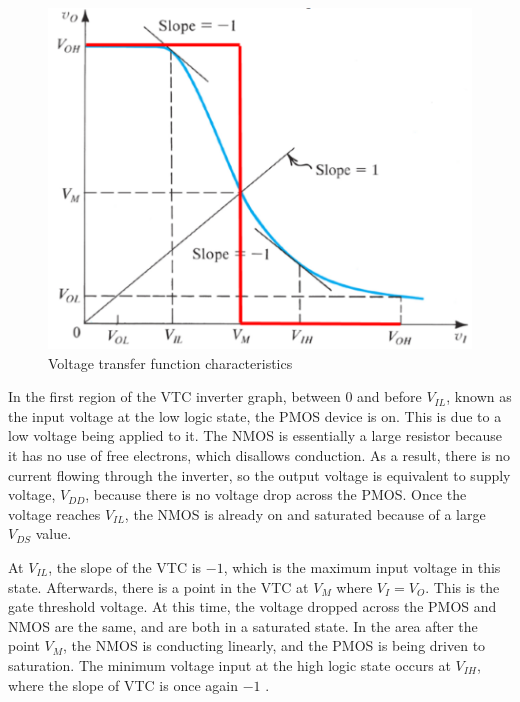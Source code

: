 \begin{figure}[H]
    \centering
        \centering
        \includegraphics[scale = .25]{CircuitDevelopment/cd4007SIM/VTCInverter.png}
        \caption{Voltage transfer function characteristics}
        \label{fig:VTCchar}
\end{figure} 

In the first region of the VTC inverter graph, between 0 and before $V_{IL}$, known as the input voltage at the low logic state, the PMOS device is on. This is due to a low voltage being applied to it. The NMOS is essentially a large resistor  because it has no use of free electrons, which disallows conduction. As a result, there is no current flowing through the inverter, so the output voltage is equivalent to supply voltage, $V_{DD}$, because there is no voltage drop across the PMOS. Once the voltage reaches $V_{IL}$, the NMOS is already on and saturated because of a large $V_{DS}$ value. \newline

At $V_{IL}$, the slope of the VTC is $-1$, which is the maximum input voltage in this state. Afterwards, there is a point in the VTC at $V_M$ where $V_I = V_O$. This is the gate threshold voltage. At this time, the voltage dropped across the PMOS and NMOS are the same, and are both in a saturated state. In the area after the point $V_M$, the NMOS is conducting linearly, and the PMOS is being driven to saturation. The minimum voltage input at the high logic state occurs at $V_{IH}$, where the slope of VTC is once again $-1$ . 

